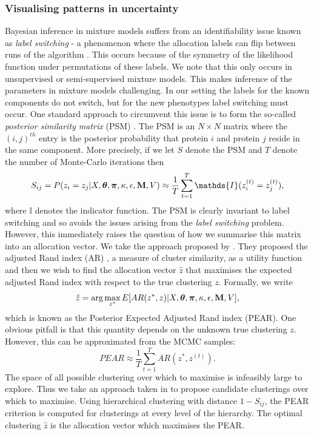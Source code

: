\documentclass[12pt,english]{article}
\begin{document}
\subsubsection{Visualising patterns in uncertainty}
Bayesian inference in mixture models suffers from an identifiability issue known as \textit{label switching} - a phenomenon where the allocation labels can flip between runs of the algorithm \citep{Stephens:2000}. This occurs because of the symmetry of the likelihood function under permutations of these labels. We note that this only occurs in unsupervised or semi-supervised mixture models. This makes inference of the parameters in mixture models challenging. In our setting the labels for the known components do not switch, but for the new phenotypes label switching must occur. One standard approach to circumvent this issue is to form the so-called \textit{posterior similarity matrix} (PSM) \citep{fritsch::2009}. The PSM is an $N\times N$ matrix where the $(i,j)^{th}$ entry is the posterior probability that protein $i$ and protein $j$ reside in the same component. More precisely, if we let $S$ denote the PSM and $T$ denote the number of Monte-Carlo iterations then 
\begin{equation}
S_{ij} = P(z_i = z_j| X, \boldsymbol{\theta}, \boldsymbol{\pi} , \kappa, \epsilon, {\bf M}, V) \approx \frac{1}{T} \sum_{t = 1}^{T} \mathds{I}(z^{(t)}_i = z^{(t)}_j),
\end{equation}
where $\mathds{I}$ denotes the indicator function. The PSM is clearly invariant to label switching and so avoids the issues arising from the \textit{label switching} problem. However, this immediately raises the question of how we summarise this matrix into an allocation vector. We take the approach proposed by \cite{fritsch::2009}. They proposed the adjusted Rand index (AR) \citep{rand::1971, Hubert::1985}, a measure of cluster similarity, as a utility function and then we wish to find the allocation vector $\hat{z}$ that maximises the expected adjusted Rand index with respect to the true clustering $z$. Formally, we write
\begin{equation}
\hat{z} = \arg \max_{z^*} E[AR(z^*, z)|X, \boldsymbol{\theta}, \boldsymbol{\pi} , \kappa, \epsilon, {\bf M}, V],
\end{equation}
which is known as the Posterior Expected Adjusted Rand index (PEAR). One obvious pitfall is that this quantity depends on the unknown true clustering $z$. However, this can be approximated from the MCMC samples:
\begin{equation}
PEAR \approx \frac{1}{T} \sum_{t = 1}^{T}AR(z^*, z^{(t)}).
\end{equation}
The space of all possible clustering over which to maximise is infeasibly large to explore. Thus we take an approach taken in \cite{fritsch::2009} to propose candidate clusterings over which to maximise. Using hierarchical clustering with distance $1 - S_{ij}$, the PEAR criterion is computed for clusterings at every level of the hierarchy. The optimal clustering $\hat{z}$ is the allocation vector which maximises the PEAR.
\end{document}
